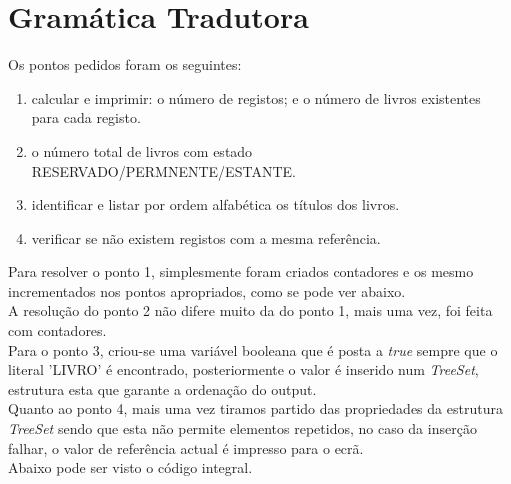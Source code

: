 \documentclass[a4paper,11pt,openright,openbib]{article}
\begin{document}
\section{Gramática Tradutora} %
\label{sec:gram_tica_tradutora}

Os pontos pedidos foram os seguintes:

\begin{enumerate}
	\item calcular e imprimir: o número de registos; e o número de livros existentes para cada registo.
	\item o número total de livros com estado RESERVADO/PERMNENTE/ESTANTE.
	\item identificar e listar por ordem alfabética os títulos dos livros.
	\item verificar se não existem registos com a mesma referência.
\end{enumerate}

Para resolver o ponto 1, simplesmente foram criados contadores e os mesmo incrementados nos pontos apropriados, como se pode ver abaixo.\\
A resolução do ponto 2 não difere muito da do ponto 1, mais uma vez, foi feita com contadores.\\
Para o ponto 3, criou-se uma variável booleana que é posta a \textit{true} sempre que o literal 'LIVRO' é encontrado, posteriormente o valor é inserido num \textit{TreeSet},
estrutura esta que garante a ordenação do output.\\
Quanto ao ponto 4, mais uma vez tiramos partido das propriedades da estrutura \textit{TreeSet} sendo que esta não permite elementos repetidos, no caso da inserção falhar,
o valor de referência actual é impresso para o ecrã.\\
Abaixo pode ser visto o código integral. 
\end{document}
